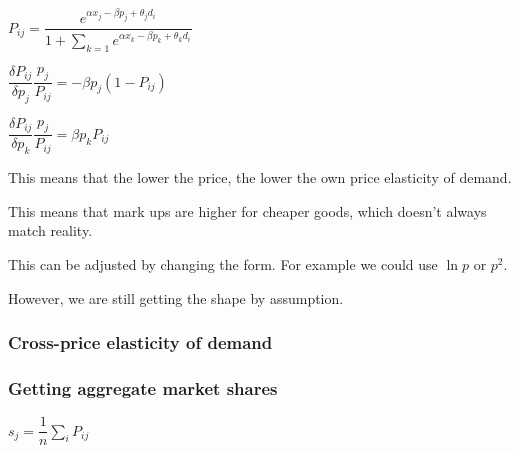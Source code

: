 \(P_{ij}=\dfrac{e^{\alpha x_j -\beta p_j + \theta_j d_i}}{1+\sum_{k=1} e^{ \alpha x_k -\beta p_k +\theta_k d_i}}\)

\(\dfrac{\delta P_{ij} }{\delta p_j}\dfrac{p_j}{P_{ij}}=-\beta p_j(1-P_{ij})\)

\(\dfrac{\delta P_{ij} }{\delta p_k}\dfrac{p_j}{P_{ij}}=\beta p_kP_{ij}\)

This means that the lower the price, the lower the own price elasticity of demand.

This means that mark ups are higher for cheaper goods, which doesn't always match reality.

This can be adjusted by changing the form. For example we could use \(\ln p\) or \(p^2\).

However, we are still getting the shape by assumption.

\subsubsection{Cross-price elasticity of demand}

\subsubsection{Getting aggregate market shares}

\(s_j = \dfrac{1}{n}\sum_i P_{ij}\)

